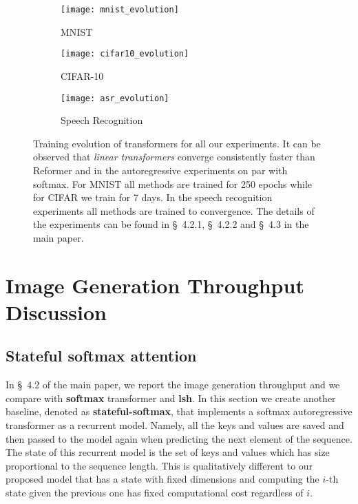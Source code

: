 \documentclass{article}
\newcommand{\linears}{\emph{linear transformers}}
\begin{document}
\begin{figure*}[h]
    \centering
    \begin{subfigure}[t]{0.33\columnwidth}
        \texttt{[image: mnist\_evolution]}
        \caption{MNIST} \label{fig:evo_mnist}
    \end{subfigure}
    \begin{subfigure}[t]{0.33\columnwidth}
        \texttt{[image: cifar10\_evolution]}
        \caption{CIFAR-10} \label{fig:evo_cifar}
    \end{subfigure}
    \begin{subfigure}[t]{0.33\columnwidth}
        \texttt{[image: asr\_evolution]}
        \caption{Speech Recognition} \label{fig:evo_asr}
    \end{subfigure}
    \caption{Training evolution of transformers for all our experiments. It can
             be observed that \linears{} converge consistently faster than
             Reformer and in the autoregressive experiments on par with
             softmax. For MNIST all methods are trained for 250 epochs while
             for CIFAR we train for 7 days. In the speech recognition
             experiments all methods are trained to convergence. The details of
             the experiments can be found in \S~4.2.1, \S~4.2.2 and \S~4.3 in
             the main paper.}
    \label{fig:evo}
\end{figure*}

\section{Image Generation Throughput Discussion} \label{sec:imgen-discussion}

\subsection{Stateful softmax attention} \label{sec:imgen-discussion-1}

In \S~4.2 of the main paper, we report the image generation
throughput and we compare with \textbf{softmax} transformer and \textbf{lsh}.
In this section we create another baseline, denoted as
\textbf{stateful-softmax}, that implements a softmax autoregressive transformer
as a recurrent model. Namely, all the keys and values are saved and then passed
to the model again when predicting the next element of the sequence. The state
of this recurrent model is the set of keys and values which has size
proportional to the sequence length. This is qualitatively different to our
proposed model that has a state with fixed dimensions and computing the $i$-th
state given the previous one has fixed computational cost regardless of $i$.
\end{document}
